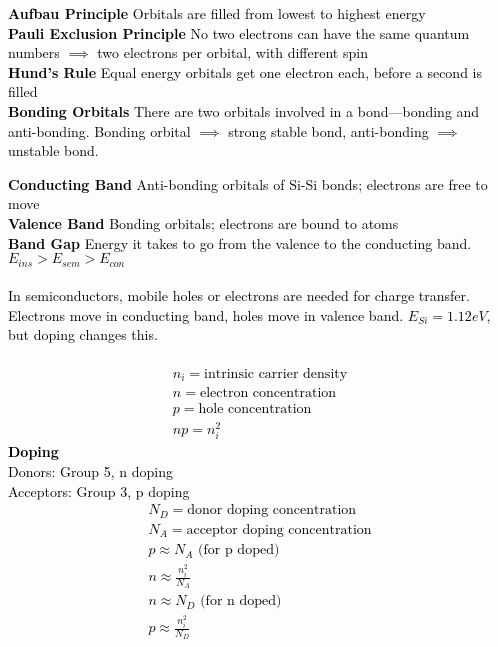 \documentclass[a4paper,8pt]{extarticle} %
\newcommand{\mybox}[2]{
    \begin{tcolorbox}[colback=lightblue!5!white,colframe=lightblue!75!black,boxsep=1pt,arc=0pt,outer arc=0pt,title={\textcolor{black}{#1}}]
        \textcolor{black}{#2}
    \end{tcolorbox}
}
\begin{document}
\begin{multicols}{2}
\mybox{Quantum Principles}{
\textbf{Aufbau Principle} Orbitals are filled from lowest to highest energy \\
\textbf{Pauli Exclusion Principle} No two electrons can have the same quantum numbers $\implies$ two electrons per orbital, with different spin \\
\textbf{Hund's Rule} Equal energy orbitals get one electron each, before a second is filled \\
\textbf{Bonding Orbitals} There are two orbitals involved in a bond---bonding and anti-bonding. Bonding orbital $\implies$ strong stable bond, anti-bonding $\implies$ unstable bond.
}

\mybox{Semiconductors}{
\textbf{Conducting Band} Anti-bonding orbitals of Si-Si bonds; electrons are free to move \\
\textbf{Valence Band} Bonding orbitals; electrons are bound to atoms \\
\textbf{Band Gap} Energy it takes to go from the valence to the conducting band. $E_{ins} > E_{sem} > E_{con}$ \\ \\
In semiconductors, mobile holes or electrons are needed for charge transfer. Electrons move in conducting band, holes move in valence band. $E_{Si} = 1.12eV$, but doping changes this. \\ \\
\begin{subequations}
\begin{align}
    n_i = \text{intrinsic carrier density} \\
    n = \text{electron concentration} \\
    p = \text{hole concentration} \\
    np = n_i^2
\end{align}
\end{subequations}
\textbf{Doping} \\ 
Donors: Group 5, n doping \\
Acceptors: Group 3, p doping
\begin{subequations}
\begin{align}
    N_D = \text{donor doping concentration} \\
    N_A = \text{acceptor doping concentration} \\
    p \approx N_A \text{  (for p doped)} \\
    n \approx \frac{n_i^2}{N_A} \\ 
    n \approx N_D \text{  (for n doped)} \\
    p \approx \frac{n_i^2}{N_D}
\end{align}
\end{subequations}
}


\end{multicols}
\end{document}
